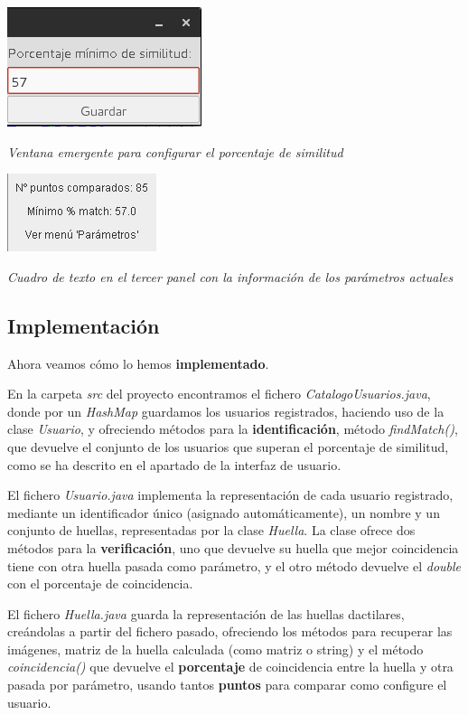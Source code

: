 \documentclass[]{article}
\begin{document}
\begin{center}
	\includegraphics[width=0.25\linewidth]{images/huellas/6.png}

	\textit{Ventana emergente para configurar el porcentaje de similitud}
\end{center}

\begin{center}
	\includegraphics[width=0.25\linewidth]{images/huellas/7.png}

	\textit{Cuadro de texto en el tercer panel con la información de los parámetros actuales}
\end{center}



\subsection{Implementación}


Ahora veamos cómo lo hemos \textbf{implementado}.
\hfill

En la carpeta \textit{src} del proyecto encontramos el fichero \textit{CatalogoUsuarios.java}, donde por un \textit{HashMap} guardamos los usuarios registrados, haciendo uso de la clase \textit{Usuario}, y ofreciendo métodos para la \textbf{identificación}, método \textit{findMatch()}, que devuelve el conjunto de los usuarios que superan el porcentaje de similitud, como se ha descrito en el apartado de la interfaz de usuario.

El fichero \textit{Usuario.java} implementa la representación de cada usuario registrado, mediante un identificador único (asignado automáticamente), un nombre y un conjunto de huellas, representadas por la clase \textit{Huella}. La clase ofrece dos métodos para la \textbf{verificación}, uno que devuelve su huella que mejor coincidencia tiene con otra huella pasada como parámetro, y el otro método devuelve el \textit{double} con el porcentaje de coincidencia.

El fichero \textit{Huella.java} guarda la representación de las huellas dactilares, creándolas a partir del fichero pasado, ofreciendo los métodos para recuperar las imágenes, matriz de la huella calculada (como matriz o string) y el método \textit{coincidencia()} que devuelve el \textbf{porcentaje} de coincidencia entre la huella y otra pasada por parámetro, usando tantos \textbf{puntos} para comparar como configure el usuario.
\end{document}
